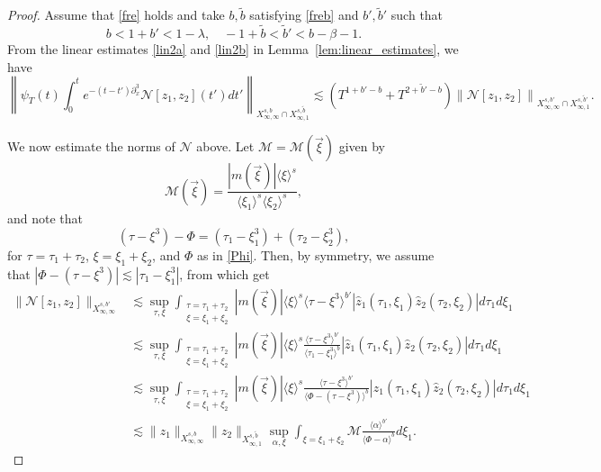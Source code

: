\documentclass[%
11pt,  reqno]{amsart}
\newcommand{\jap}[1]{\langle #1 \rangle}
\newcommand{\5}{\textup{V}}
\newcommand{\ft}{\widehat}
\newcommand{\les}{\lesssim}
\newcommand{\wt}{\widetilde}
\theoremstyle{remark}
\newcommand{\jb}[1]
{\langle #1 \rangle}
\newcommand{\M}{\mathcal{M}}
\numberwithin{equation}{section}
\numberwithin{theorem}{section}
\newcommand{\Ncal}{\mathcal{N}}
\begin{document}
		\begin{proof}
Assume that \eqref{fre} holds and take $b,\wt b$ satisfying \eqref{freb} and $b', \wt b'$ such that
			$$
			 b < 1+b'< 1-\lambda,\quad -1+\wt{b}<\wt{b}'<b-\beta-1.
$$
From the linear estimates \eqref{lin2a} and \eqref{lin2b} in Lemma~\ref{lem:linear_estimates}, we have
        $$
        \left\|\psi_T(t)\int_0^t e^{-(t-t')\partial_x^3}\Ncal[z_1,z_2](t')dt' \right\|_{X^{s,b}_{\infty, \infty} \cap X^{s,\tilde{b}}_{\infty,1}}  \lesssim (T^{1+b'-b} + T^{2+\tilde{b}'-b})\left\|\Ncal[z_1,z_2] \right\|_{X^{s,b'}_{\infty, \infty} \cap X^{s,\tilde{b}'}_{\infty,1}}.
        $$

We now estimate the norms of $\Ncal$ above. Let $\M = \M(\vec\xi)$ given by
\begin{equation}
\mathcal{M}(\vec\xi)=\frac{|m(\vec\xi)|\jap{\xi}^s}{\jap{\xi_1}^s\jap{\xi_2}^s}, 
\end{equation}
and note that 
\begin{equation}
(\tau - \xi^3) - \Phi = (\tau_1 - \xi_1^3 ) + (\tau_2 - \xi_2^3), 
\end{equation}
for $\tau=\tau_1+ \tau_2$, $\xi=\xi_1+\xi_2$, and $\Phi$ as in \eqref{Phi}. Then, by symmetry, we assume that $|\Phi - (\tau-\xi^3) | \les |\tau_1 - \xi_1^3|$, from which get
	\begin{align}
				\|\Ncal[z_1,z_2] \|_{X^{s,b'}_{\infty, \infty}} &\lesssim \sup_{\tau,\xi} \int_{\substack{\tau=\tau_1+\tau_2 \\ \xi = \xi_1 + \xi_2}} 
|m(\vec\xi) | \jb{\xi}^s
\jap{\tau-\xi^3}^{b'}
|\ft{z}_1(\tau_1, \xi_1) 
\ft{z}_2(\tau_2, \xi_2)
| 
d\tau_1 d\xi_1 \\
&
\lesssim \sup_{\tau,\xi} \int_{\substack{\tau=\tau_1+\tau_2 \\ \xi = \xi_1 + \xi_2}} 
|m(\vec\xi) | \jb{\xi}^s
\frac{\jap{\tau-\xi^3}^{b'}}{\jap{\tau_1-\xi_1^3}^b  }
|\ft{z}_1(\tau_1, \xi_1) 
\ft{z}_2(\tau_2, \xi_2)
| 
d\tau_1 d\xi_1
\\
&
\lesssim \sup_{\tau,\xi} \int_{\substack{\tau=\tau_1+\tau_2 \\ \xi = \xi_1 + \xi_2}} 
|m(\vec\xi) | \jb{\xi}^s
\frac{\jap{\tau-\xi^3}^{b'}}{\jap{\Phi-(\tau-\xi^3)}^b  } 
|\ft{z}_1(\tau_1, \xi_1) 
\ft{z}_2(\tau_2, \xi_2)
| 
d\tau_1 d\xi_1
\\
& 
\lesssim 
 \|z_1\|_{X^{s,b}_{\infty,\infty}}
 \|z_2\|_{X^{s,\wt b}_{\infty, 1}}
\sup_{\alpha,\xi} 
\int_{\xi = \xi_1 + \xi_2}  \mathcal{M}\frac{\jap{\alpha}^{b'}}{\jap{\Phi-\alpha}^b  } d\xi_1 . 
\label{FREinfty1}
			\end{align}



\end{proof}
\end{document}
